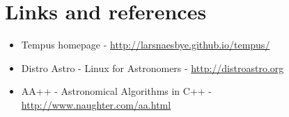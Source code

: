 \section{Links and references}

\begin{itemize}
    \item Tempus homepage - \url{http://larsnaesbye.github.io/tempus/}
    \item Distro Astro - Linux for Astronomers - \url{http://distroastro.org}
    \item AA++ - Astronomical Algorithms in C++ - \url{http://www.naughter.com/aa.html}
\end{itemize}

